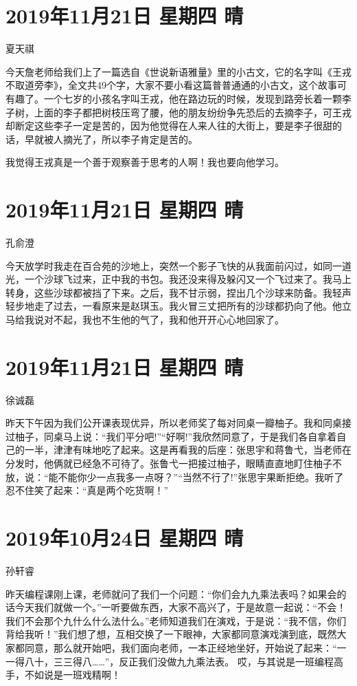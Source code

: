 \section{2019年11月21日 星期四 晴}

夏天祺

今天詹老师给我们上了一篇选自《世说新语雅量》里的小古文，它的名字叫《王戎不取道旁李》，全文共49个字，大家不要小看这篇普普通通的小古文，这个故事可有趣了。一个七岁的小孩名字叫王戎，他在路边玩的时候，发现到路旁长着一颗李子树，上面的李子都把树枝压弯了腰，他的朋友纷纷争先恐后的去摘李子，可王戎却断定这些李子一定是苦的，因为他觉得在人来人往的大街上，要是李子很甜的话，早就被人摘光了，所以李子肯定是苦的。

我觉得王戎真是一个善于观察善于思考的人啊！我也要向他学习。

\section{2019年11月21日 星期四 晴}

孔俞澄

今天放学时我走在百合苑的沙地上，突然一个影子飞快的从我面前闪过，如同一道光，一个沙球飞过来，正中我的书包。我还没来得及躲闪又一个飞过来了。我马上转身，这些沙球都被挡了下来。之后，我不甘示弱，捏出几个沙球来防备。我轻声轻步地走了过去，一看原来是赵琪玉。我火冒三丈把所有的沙球都扔向了他。他立马给我说对不起，我也不生他的气了，我和他开开心心地回家了。

\section{2019年11月21日 星期四 晴}

徐诚磊

昨天下午因为我们公开课表现优异，所以老师奖了每对同桌一瓣柚子。我和同桌接过柚子，同桌马上说：``我们平分吧!''``好啊!''我欣然同意了，于是我们各自拿着自己的一半，津津有味地吃了起来。这是再看我的后座：张思宇和蒋鲁弋，当老师在分发时，他俩就已经急不可待了。张鲁弋一把接过柚子，眼睛直直地盯住柚子不放，说：``能不能你少一点我多一点呀？''``当然不行了!''张思宇果断拒绝。我听了忍不住笑了起来：``真是两个吃货啊！''

\section{2019年10月24日 星期四 晴}

孙轩睿

昨天编程课刚上课，老师就问了我们一个问题：``你们会九九乘法表吗？如果会的话今天我们就做一个。''一听要做东西，大家不高兴了，于是故意一起说：``不会！我们不会那个九什么什么法什么。''老师知道我们在演戏，于是说：``我不信，你们背给我听！''我们想了想，互相交换了一下眼神，大家都同意演戏演到底，既然大家都同意，那么就开始吧，我们面向老师，一本正经地坐好，开始说了起来：``一一得八十，三三得八\ldots\ldots{}''，反正我们没做九九乘法表。
哎，与其说是一班编程高手，不如说是一班戏精啊！

